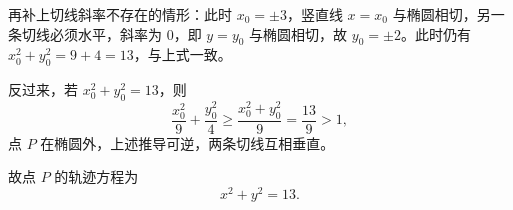 \begin{answer}
再补上切线斜率不存在的情形：此时 $x_0=\pm3$，竖直线 $x=x_0$ 与椭圆相切，另一条切线必须水平，斜率为 $0$，即 $y=y_0$ 与椭圆相切，故 $y_0=\pm2$。此时仍有 $x_0^2+y_0^2=9+4=13$，与上式一致。

反过来，若 $x_0^2+y_0^2=13$，则
\nopagebreak[4]
\[\frac{x_0^2}{9}+\frac{y_0^2}{4}\geqslant\frac{x_0^2+y_0^2}{9}=\frac{13}{9}>1,\]
点 $P$ 在椭圆外，上述推导可逆，两条切线互相垂直。

故点 $P$ 的轨迹方程为
\nopagebreak[4]
\[x^2+y^2=13 .\]



\end{answer}
